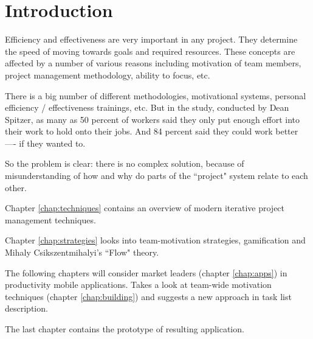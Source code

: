 \chapter*{Introduction}


Efficiency and effectiveness are very important in any project. They determine the speed of moving towards goals and required resources. These concepts are affected by a number of various reasons including motivation of team members, project management methodology, ability to focus, etc.

There is a big number of different methodologies, motivational systems, personal efficiency / effectiveness trainings, etc. But in the study, conducted by Dean Spitzer, as many as 50 percent of workers said they only put enough effort into their work to hold onto their jobs. And 84 percent said they could work better —- if they wanted to. \cite{spitzer}

So the problem is clear: there is no complex solution, because of misunderstanding of how and why do parts of the ``project" system relate to each other.

Chapter \ref{chap:techniques} contains an overview of modern iterative project management techniques.

Chapter \ref{chap:strategies} looks into team-motivation strategies, gamification and Mihaly Csikszentmihalyi's ``Flow" theory.

The following chapters will consider market leaders (chapter \ref{chap:apps}) in productivity mobile applications. Takes a look at team-wide motivation techniques (chapter \ref{chap:building}) and suggests a new approach in task list description.

The last chapter contains the prototype of resulting application.